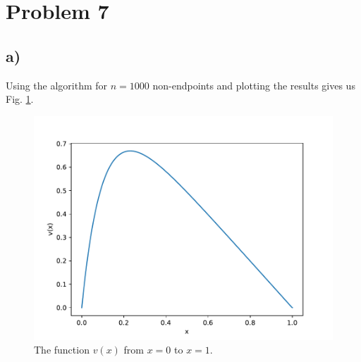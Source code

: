 \documentclass[english,notitlepage]{revtex4-2}  %
\begin{document}
\section*{Problem 7}
\subsection*{a)}
Using the algorithm for $n=1000$ non-endpoints and plotting the results gives us Fig. \ref{fig:2}.

\begin{figure}
	\includegraphics[scale=0.9]{imgs/problem7_output.pdf}
	\caption{The function $v(x)$ from $x=0$ to $x=1$.}
	\label{fig:2}
\end{figure}
\end{document}
